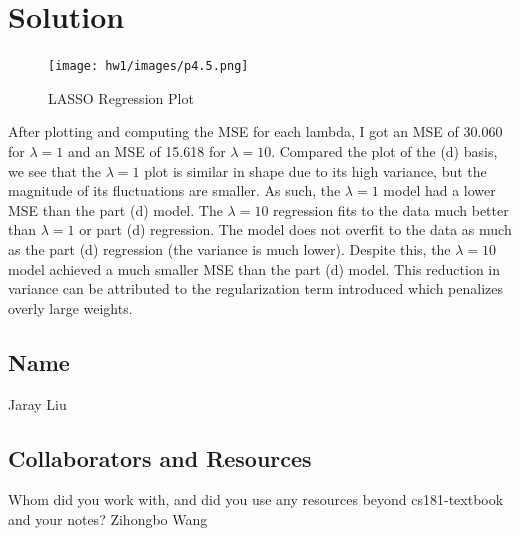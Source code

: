 \documentclass[submit]{../harvardml}
\newenvironment{solution}
  {\color{black}\section*{Solution}}
{}
\begin{document}
\begin{solution}
\begin{figure}[H]
        \centering
        \texttt{[image: hw1/images/p4.5.png]}
        \caption{LASSO Regression Plot}
    \end{figure}
    \begin{tcolorbox}
       After plotting and computing the MSE for each lambda, I got an MSE of 30.060 for $\lambda = 1$ and an MSE of 15.618 for $\lambda = 10$. Compared the plot of the (d) basis, we see that the $\lambda = 1$ plot is similar in shape due to its high variance, but the magnitude of its fluctuations are smaller. As such, the $\lambda = 1$ model had a lower MSE than the part (d) model. The $\lambda = 10$ regression fits to the data much better than $\lambda = 1$ or part (d) regression. The model does not overfit to the data as much as the part (d) regression (the variance is much lower). Despite this, the $\lambda = 10$ model achieved a much smaller MSE than the part (d) model. This reduction in variance can be attributed to the regularization term introduced which penalizes overly large weights.
    \end{tcolorbox}
\end{solution}


\newpage
\subsection*{Name}
Jaray Liu
\subsection*{Collaborators and Resources}
Whom did you work with, and did you use any resources beyond cs181-textbook and your notes?
Zihongbo Wang
\end{document}
